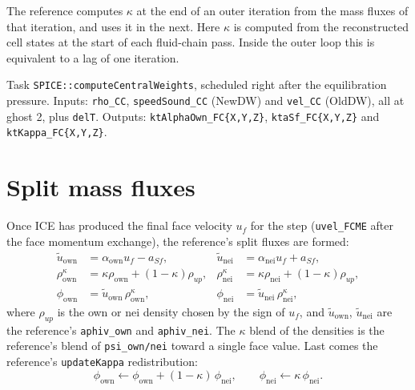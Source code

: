 \documentclass[11pt]{article}
\newcommand{\code}[1]{\texttt{\small #1}}
\newcommand{\own}{\mathrm{own}}
\newcommand{\nei}{\mathrm{nei}}
\begin{document}
\begin{deviation}
The reference computes $\kappa$ at the end of an outer iteration from the mass fluxes of
that iteration, and uses it in the next. Here $\kappa$ is computed from the reconstructed
cell states at the start of each fluid-chain pass. Inside the outer loop this is equivalent
to a lag of one iteration.
\end{deviation}

\begin{incode}
Task \code{SPICE::computeCentralWeights}, scheduled right after the equilibration pressure.
Inputs: \code{rho\_CC}, \code{speedSound\_CC} (NewDW) and \code{vel\_CC} (OldDW), all at ghost 2,
plus \code{delT}. Outputs: \code{ktAlphaOwn\_FC\{X,Y,Z\}}, \code{ktaSf\_FC\{X,Y,Z\}} and
\code{ktKappa\_FC\{X,Y,Z\}}.
\end{incode}

\section{Split mass fluxes}\label{sec:flux}

Once ICE has produced the final face velocity $u_f$ for the step (\code{uvel\_FCME} after the
face momentum exchange), the reference's split fluxes are formed:
\begin{align}
  \tilde u_\own &= \alpha_\own u_f - a_{Sf}, &
  \tilde u_\nei &= \alpha_\nei u_f + a_{Sf}, \label{eq:aphiv}\\
  \rho^\kappa_\own &= \kappa\rho_\own + (1-\kappa)\rho_{up}, &
  \rho^\kappa_\nei &= \kappa\rho_\nei + (1-\kappa)\rho_{up}, \\
  \phi_\own &= \tilde u_\own\,\rho^\kappa_\own, &
  \phi_\nei &= \tilde u_\nei\,\rho^\kappa_\nei ,
\end{align}
where $\rho_{up}$ is the own or nei density chosen by the sign of $u_f$, and
$\tilde u_\own$, $\tilde u_\nei$ are the reference's \code{aphiv\_own} and \code{aphiv\_nei}. The
$\kappa$ blend of the densities is the reference's blend of \code{psi\_own/nei} toward a
single face value. Last comes the reference's \code{updateKappa} redistribution:
\begin{equation}
  \phi_\own \leftarrow \phi_\own + (1-\kappa)\,\phi_\nei,\qquad
  \phi_\nei \leftarrow \kappa\,\phi_\nei .
\end{equation}
\end{document}
